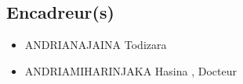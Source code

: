 \documentclass[10pt]{article}
\begin{document}
\subsection*{Encadreur(s)}
\begin{itemize}
	\item ANDRIANAJAINA Todizara%
	\item ANDRIAMIHARINJAKA Hasina , Docteur %
\end{itemize}
\end{document}
